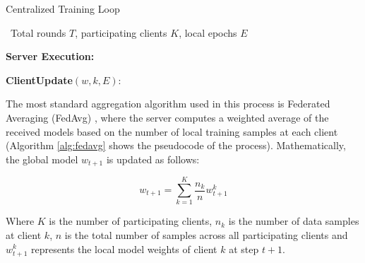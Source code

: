 \begin{ifalgorithm}[t]
\caption{Standard Federated Averaging (FedAvg)}
\label{alg:fedavg}
\begin{ifpseudo}{Centralized Training Loop}
    \item \In\ Total rounds $T$, participating clients $K$, local epochs $E$
    \item \textbf{Server Execution:}
    \item {}
    \item {}
    \item {}
    \item {}
    \item {}
    \item \TT{\Done}
    \item {}
    \item {}
    \item \T{\EFor}
    \item \vspace{0.5em}
    \item \textbf{ClientUpdate}$(w, k, E)$:
    \item {}
    \item {}
    \item {}
    \item \T{\EFor}
    \item {}
\end{ifpseudo}
\end{ifalgorithm}

The most standard aggregation algorithm used in this process is Federated Averaging (FedAvg) \cite{mcmahan2017communication}, where the server computes a weighted average of the received models based on the number of local training samples at each client (Algorithm \ref{alg:fedavg} shows the pseudocode of the process). Mathematically, the global model $w_{t+1}$ is updated as follows:

\begin{equation}
w_{t+1} = \sum_{k=1}^K \frac{n_k}{n} w_{t+1}^k
\end{equation}

Where $K$ is the number of participating clients, $n_k$ is the number of data samples at client $k$, $n$ is the total number of samples across all participating clients and $w_{t+1}^k$ represents the local model weights of client $k$ at step $t+1$.

